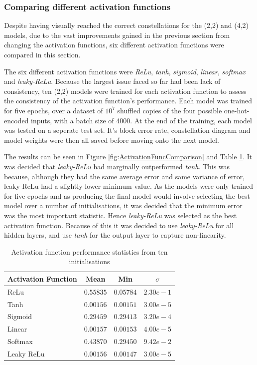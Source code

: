 \documentclass[12pt,onecolumn,letterpaper]{article}
\newcommand{\code}{\textit}
\begin{document}
\subsubsection{Comparing different activation functions}

Despite having visually reached the correct constellations for the (2,2) and (4,2) models, due to the vast improvements gained in the previous section from changing the activation functions, six different activation functions were compared in this section.

The six different activation functions were \code{ReLu}, \code{tanh}, \code{sigmoid}, \code{linear}, \code{softmax} and \code{leaky-ReLu}. Because the largest issue faced so far had been lack of consistency, ten (2,2) models were trained for each activation function to assess the consistency of the activation function's performance. Each model was trained for five epochs, over a dataset of $10^7$ shuffled copies of the four possible one-hot-encoded inputs, with a batch size of 4000. At the end of the training, each model was tested on a seperate test set. It's block error rate, constellation diagram and model weights were then all saved before moving onto the next model.

The results can be seen in Figure \ref{fig:ActivationFuncComparison} and Table \ref{tab:ActivationFuncComparison}. It was decided that \code{leaky-ReLu} had marginally outperformed \code{tanh}. This was because, although they had the same average error and same variance of error, leaky-ReLu had a slightly lower minimum value. As the models were only trained for five epochs and as producing the final model would involve selecting the best model over a number of initialisations, it was decided that the minimum error was the most important statistic. Hence \code{leaky-ReLu} was selected as the best activation function. Because of this it was decided to use \code{leaky-ReLu} for all hidden layers, and use \code{tanh} for the output layer to capture non-linearity. 

\begin{table}[H]
\begin{center}
\begin{tabular}{|l|c|c|c|}
\hline
Activation Function & Mean & Min & $\sigma$\\
\hline\hline
ReLu & $0.55835$ & $0.05784$ & $2.30e-1$ \\
Tanh & $0.00156$ & $0.00151$ & $3.00e-5$ \\
Sigmoid & $0.29459$ & $0.29413$ & $3.20e-4$\\
Linear & $0.00157$ & $0.00153$ & $4.00e-5$\\
Softmax & $0.43870$ & $0.29450$ & $9.42e-2$\\
Leaky ReLu & $0.00156$ & $0.00147$ & $3.00e-5$\\
\hline
\end{tabular}
\end{center}
\caption{Activation function performance statistics from ten initialisations}
\label{tab:ActivationFuncComparison}
\end{table}
\end{document}
